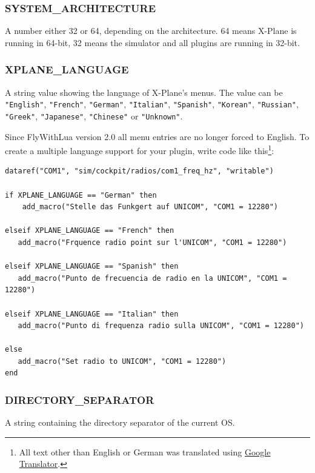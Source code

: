 \documentclass[11pt,parskip=half,a4paper]{scrartcl}
\begin{document}
\subsubsection{SYSTEM\_ARCHITECTURE}

A number either 32 or 64, depending on the architecture. 64 means X-Plane is running in 64-bit, 32 means the simulator and all plugins are running in 32-bit.

\subsubsection{XPLANE\_LANGUAGE}

A string value showing the language of X-Plane's menus. The value can be \verb|"English"|, \verb|"French"|, \verb|"German"|, \verb|"Italian"|, \verb|"Spanish"|, \verb|"Korean"|, \verb|"Russian"|, \verb|"Greek"|, \verb|"Japanese"|, \verb|"Chinese"| or \verb|"Unknown"|.

\newpage
Since FlyWithLua version 2.0 all menu entries are no longer forced to English. To create a multiple language support for your plugin, write code like this\footnote{All text other than English or German was translated using \href{http://translate.google.com/}{Google Translator}.}:

\begin{lstlisting}
dataref("COM1", "sim/cockpit/radios/com1_freq_hz", "writable")

if XPLANE_LANGUAGE == "German" then
    add_macro("Stelle das Funkgert auf UNICOM", "COM1 = 12280")

elseif XPLANE_LANGUAGE == "French" then
   add_macro("Frquence radio point sur l'UNICOM", "COM1 = 12280")

elseif XPLANE_LANGUAGE == "Spanish" then
   add_macro("Punto de frecuencia de radio en la UNICOM", "COM1 = 12280")

elseif XPLANE_LANGUAGE == "Italian" then
   add_macro("Punto di frequenza radio sulla UNICOM", "COM1 = 12280")

else
   add_macro("Set radio to UNICOM", "COM1 = 12280")
end

\end{lstlisting}

\subsubsection{DIRECTORY\_SEPARATOR}

A string containing the directory separator of the current OS.
\end{document}
